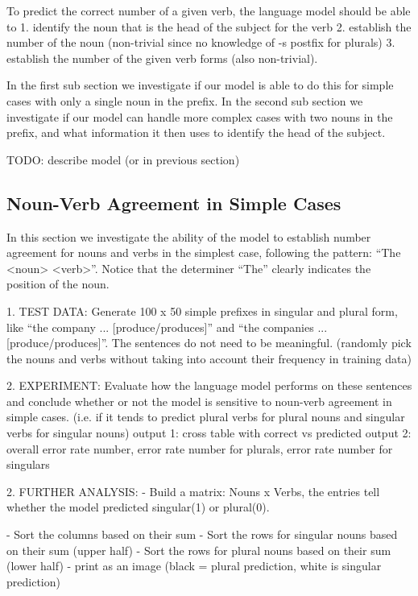 \begin{multicols}{2}


To predict the correct number of a given verb,
the language model should be able to
1. identify the noun that is the head of the subject for the verb
2. establish the number of the noun (non-trivial since no knowledge of -s postfix for plurals)
3. establish the number of the given verb forms (also non-trivial).

In the first sub section we investigate if our model is able to
do this for simple cases with only a single noun in the prefix.
%
In the second sub section we investigate if our model can handle
more complex cases with two nouns in the prefix,
and what information it then uses to identify the head of the subject.

TODO: describe model (or in previous section)

\subsection{Noun-Verb Agreement in Simple Cases}


In this section we investigate the ability of the model to
establish number agreement for nouns and verbs in the simplest case,
following the pattern: ``The <noun> <verb>''. Notice that
the determiner ``The'' clearly indicates the position of the noun.

1. TEST DATA: 
Generate 100 x 50 simple prefixes in singular and plural form, like ``the company ... [produce/produces]'' 
and ``the companies ... [produce/produces]''.
The sentences do not need to be meaningful.
(randomly pick the nouns and verbs without taking into account their frequency in training data)

2. EXPERIMENT: 
Evaluate how the language model performs on these sentences 
and conclude whether or not the model is sensitive to noun-verb agreement in simple cases. 
(i.e. if it tends to predict plural verbs for plural nouns and singular verbs for singular nouns)
output 1: cross table with correct vs predicted
output 2: overall error rate number, error rate number for plurals, error rate number for singulars 


2. FURTHER ANALYSIS:
- Build a matrix: Nouns x Verbs, 
the entries tell whether the model predicted singular(1)
or plural(0).

- Sort the columns based on their sum
- Sort the rows for singular nouns based on their sum (upper half)
- Sort the rows for plural nouns based on their sum (lower half)
- print as an image (black = plural prediction, white is singular prediction)


\end{multicols}
